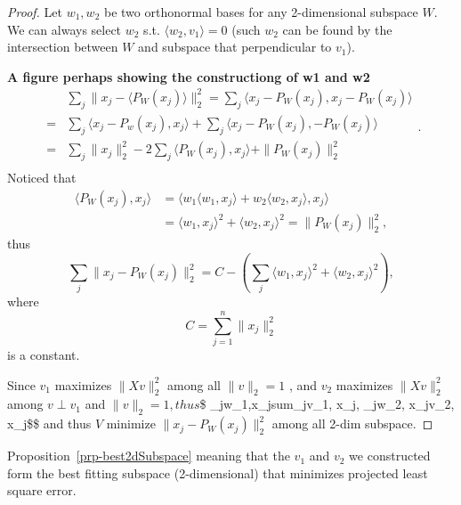 \documentclass[
  letterpaper,
  DIV=11,
  numbers=noendperiod]{scrreprt}
\theoremstyle{definition}
\theoremstyle{plain}
\theoremstyle{plain}
\theoremstyle{definition}
\theoremstyle{plain}
\theoremstyle{plain}
\theoremstyle{remark}
\begin{document}
\begin{proof}
Let \(w_1, w_2\) be two orthonormal bases for any 2-dimensional subspace
\(W\). We can always select \(w_2\) s.t. \(\langle w_2,v_1 \rangle = 0\)
(such \(w_2\) can be found by the intersection between \(W\) and
subspace that perpendicular to \(v_1\)).

\textbf{A figure perhaps showing the constructiong of w1 and w2} \[
\begin{align}
&\sum_j \|x_j - \langle P_W(x_j)\rangle\|_2^2 = \sum_j \langle x_j-P_W(x_j), x_j-P_W(x_j) \rangle\\ 
={}&\sum_j\langle x_j - P_w(x_j), x_j\rangle + \sum_j\langle x_j - P_W(x_j), -P_W(x_j)\rangle\\
={}&\sum_j\|x_j\|^2_2 - 2\sum_j\langle P_W(x_j), x_j\rangle + \|P_W(x_j)\|^2_2\\
\end{align}.
\] Noticed that \[
\begin{align}
\langle P_W(x_j), x_j \rangle &= \langle w_1\langle w_1, x_j\rangle + w_2\langle w_2, x_j\rangle, x_j\rangle\\
& = \langle w_1, x_j\rangle^2 + \langle w_2, x_j\rangle^2=\|P_W(x_j)\|^2_2,
\end{align}
\] thus \[
\sum_j\|x_j - P_W(x_j)\|^2_2 = C - (\sum_j \langle w_1, x_j \rangle^2 + \langle w_2, x_j \rangle^2),
\] where \[
C = \sum_{j=1}^n \| x_j \|_2^2
\] is a constant.

Since \(v_1\) maximizes \(\|Xv\|_2^2\) among all \(\|v\|_2=1\) , and
\(v_2\) maximizes \(\|Xv\|_2^2\) among \(v \perp v_1\) and
\(\|v\|_2=1, thus\)\$
\sum\_j\langle w\_1,x\_j\rangle\leq sum\_j\langle v\_1, x\_j\rangle,
\sum\_j\langle w\_2, x\_j\rangle \leq \langle v\_2, x\_j\rangle \$\$ and
thus \(V\) minimize \(\|x_j-P_W(x_j)\|^2_2\) among all 2-dim subspace.
\end{proof}

\begin{tcolorbox}[enhanced jigsaw, bottomrule=.15mm, title=\textcolor{quarto-callout-note-color}{\faInfo}\hspace{0.5em}{Note}, left=2mm, colback=white, toprule=.15mm, bottomtitle=1mm, titlerule=0mm, leftrule=.75mm, colbacktitle=quarto-callout-note-color!10!white, opacitybacktitle=0.6, coltitle=black, colframe=quarto-callout-note-color-frame, rightrule=.15mm, breakable, toptitle=1mm, arc=.35mm, opacityback=0]

Proposition~\ref{prp-best2dSubspace} meaning that the \(v_1\) and
\(v_2\) we constructed form the best fitting subspace (2-dimensional)
that minimizes projected least square error.

\end{tcolorbox}
\end{document}
